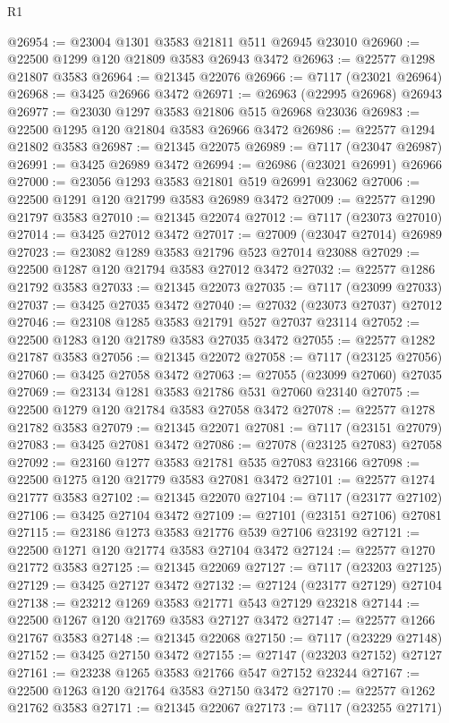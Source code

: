 \begin{lexlean}{R1}
\begin{coremodule}
@26954 := @23004 @1301 @3583 @21811 @511 @26945 @23010
@26960 := @22500 @1299 @120 @21809 @3583 @26943 @3472
@26963 := @22577 @1298 @21807 @3583
@26964 := @21345 @22076
@26966 := @7117 (@23021 @26964)
@26968 := @3425 @26966 @3472
@26971 := @26963 (@22995 @26968) @26943
@26977 := @23030 @1297 @3583 @21806 @515 @26968 @23036
@26983 := @22500 @1295 @120 @21804 @3583 @26966 @3472
@26986 := @22577 @1294 @21802 @3583
@26987 := @21345 @22075
@26989 := @7117 (@23047 @26987)
@26991 := @3425 @26989 @3472
@26994 := @26986 (@23021 @26991) @26966
@27000 := @23056 @1293 @3583 @21801 @519 @26991 @23062
@27006 := @22500 @1291 @120 @21799 @3583 @26989 @3472
@27009 := @22577 @1290 @21797 @3583
@27010 := @21345 @22074
@27012 := @7117 (@23073 @27010)
@27014 := @3425 @27012 @3472
@27017 := @27009 (@23047 @27014) @26989
@27023 := @23082 @1289 @3583 @21796 @523 @27014 @23088
@27029 := @22500 @1287 @120 @21794 @3583 @27012 @3472
@27032 := @22577 @1286 @21792 @3583
@27033 := @21345 @22073
@27035 := @7117 (@23099 @27033)
@27037 := @3425 @27035 @3472
@27040 := @27032 (@23073 @27037) @27012
@27046 := @23108 @1285 @3583 @21791 @527 @27037 @23114
@27052 := @22500 @1283 @120 @21789 @3583 @27035 @3472
@27055 := @22577 @1282 @21787 @3583
@27056 := @21345 @22072
@27058 := @7117 (@23125 @27056)
@27060 := @3425 @27058 @3472
@27063 := @27055 (@23099 @27060) @27035
@27069 := @23134 @1281 @3583 @21786 @531 @27060 @23140
@27075 := @22500 @1279 @120 @21784 @3583 @27058 @3472
@27078 := @22577 @1278 @21782 @3583
@27079 := @21345 @22071
@27081 := @7117 (@23151 @27079)
@27083 := @3425 @27081 @3472
@27086 := @27078 (@23125 @27083) @27058
@27092 := @23160 @1277 @3583 @21781 @535 @27083 @23166
@27098 := @22500 @1275 @120 @21779 @3583 @27081 @3472
@27101 := @22577 @1274 @21777 @3583
@27102 := @21345 @22070
@27104 := @7117 (@23177 @27102)
@27106 := @3425 @27104 @3472
@27109 := @27101 (@23151 @27106) @27081
@27115 := @23186 @1273 @3583 @21776 @539 @27106 @23192
@27121 := @22500 @1271 @120 @21774 @3583 @27104 @3472
@27124 := @22577 @1270 @21772 @3583
@27125 := @21345 @22069
@27127 := @7117 (@23203 @27125)
@27129 := @3425 @27127 @3472
@27132 := @27124 (@23177 @27129) @27104
@27138 := @23212 @1269 @3583 @21771 @543 @27129 @23218
@27144 := @22500 @1267 @120 @21769 @3583 @27127 @3472
@27147 := @22577 @1266 @21767 @3583
@27148 := @21345 @22068
@27150 := @7117 (@23229 @27148)
@27152 := @3425 @27150 @3472
@27155 := @27147 (@23203 @27152) @27127
@27161 := @23238 @1265 @3583 @21766 @547 @27152 @23244
@27167 := @22500 @1263 @120 @21764 @3583 @27150 @3472
@27170 := @22577 @1262 @21762 @3583
@27171 := @21345 @22067
@27173 := @7117 (@23255 @27171)

\end{coremodule}
\end{lexlean}

